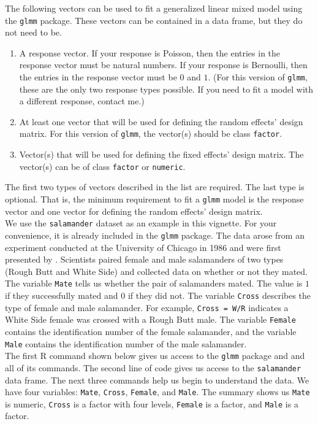\documentclass[11pt]{article}\usepackage[]{graphicx}\usepackage[]{color}
\begin{document}
The following vectors can be used to fit a generalized linear mixed model using the \texttt{glmm} package. These vectors can be contained in a data frame, but they do not need to be.
\begin{enumerate}
\item A response vector. If your response is Poisson, then the entries in the response vector must be natural numbers. If your response is Bernoulli, then the entries in the response vector must be $0$ and $1$. (For this version of \texttt{glmm}, these are the only two response types possible. If you need to fit a model with a different response, contact me.) 
\item At least one vector that will be used for defining the random effects' design matrix. For this version of \texttt{glmm}, the vector(s) should be class \texttt{factor}.
\item Vector(s) that will be used for defining the fixed effects' design matrix. The vector(s) can be of class \texttt{factor} or \texttt{numeric}. 
\end{enumerate}
The first two types of vectors described in the list are required. The last type is optional. That is, the minimum requirement to fit a \texttt{glmm} model is the response vector and one vector for defining the random effects' design matrix. \\


We use the \texttt{salamander} dataset as an example in this vignette. For your convenience, it is already included in the \texttt{glmm} package. The data arose from an experiment conducted at the University of Chicago in 1986 and were first presented by \citet[section 14.5]{mcc:nelder:1989}. Scientists paired female and male salamanders of two types (Rough Butt and White Side) and collected data on whether or not they mated.  \\

The variable \texttt{Mate} tells us whether the pair of salamanders mated. The value is $1$ if they successfully mated and $0$ if they did not. The variable \texttt{Cross} describes the type of female and male salamander. For example, \texttt{Cross = W/R} indicates a White Side female was crossed with a Rough Butt male. The variable \texttt{Female} contains the identification number of the female salamander, and the variable \texttt{Male} contains the identification number of the male salamander.\\ 

The first R  command shown below gives us access to the \texttt{glmm} package and and all of its commands. The second line of code gives us access to the \texttt{salamander} data frame.  The next three commands help us begin to understand the data. We have four variables: \texttt{Mate}, \texttt{Cross}, \texttt{Female}, and \texttt{Male}. The summary shows us \texttt{Mate} is numeric, \texttt{Cross} is a factor with four levels, \texttt{Female} is a factor, and \texttt{Male} is a factor. 
\end{document}
